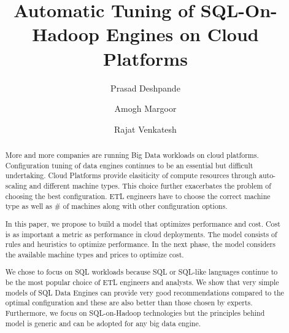 \documentclass[sigconf]{acmart}
\begin{document}
\title{Automatic Tuning of SQL-On-Hadoop Engines on Cloud Platforms}

\author{Prasad Deshpande}

\author{Amogh Margoor}

\author{Rajat Venkatesh}

\renewcommand{\shortauthors}{P. Deshpande et al.}


\begin{abstract}
More and more companies are running Big Data workloads on cloud platforms. Configuration tuning of data engines continues to be an essential but difficult undertaking. Cloud Platforms provide elasiticity of compute resources through auto-scaling and different machine types. This choice further exacerbates the problem of choosing the best configuration. ETL engineers have to choose the correct machine type as well as \# of machines along with other configuration options.

In this paper, we propose to build a model that optimizes performance and cost. Cost is as important a metric as performance in cloud deployments. The model consists of rules and heuristics to optimize performance. In the next phase, the model considers the available machine types and prices to optimize cost. 

We chose to focus on SQL workloads because SQL or SQL-like languages continue to be the most popular choice of ETL engineers and analysts. We show that very simple models of SQL Data Engines can provide very good recommendations compared to the optimal configuration and these are also better than those chosen by experts. Furthermore, we focus on SQL-on-Hadoop technologies but the principles behind model is generic and can be adopted for any big data engine. 
\end{abstract}



\maketitle



%





 
\end{document}
